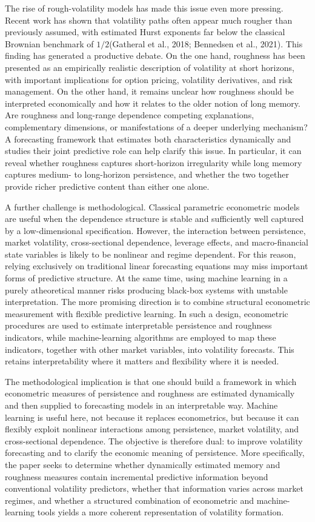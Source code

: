 \documentclass[12pt]{article}
\begin{document}
The rise of rough-volatility models has made this issue even more pressing. Recent work has shown that volatility paths often appear much rougher than previously assumed, with estimated Hurst exponents far below the classical Brownian benchmark of $1/2$(Gatheral et al., 2018; Bennedsen et al., 2021). This finding has generated a productive debate. On the one hand, roughness has been presented as an empirically realistic description of volatility at short horizons, with important implications for option pricing, volatility derivatives, and risk management. On the other hand, it remains unclear how roughness should be interpreted economically and how it relates to the older notion of long memory. Are roughness and long-range dependence competing explanations, complementary dimensions, or manifestations of a deeper underlying mechanism? A forecasting framework that estimates both characteristics dynamically and studies their joint predictive role can help clarify this issue. In particular, it can reveal whether roughness captures short-horizon irregularity while long memory captures medium- to long-horizon persistence, and whether the two together provide richer predictive content than either one alone.

A further challenge is methodological. Classical parametric econometric models are useful when the dependence structure is stable and sufficiently well captured by a low-dimensional specification. However, the interaction between persistence, market volatility, cross-sectional dependence, leverage effects, and macro-financial state variables is likely to be nonlinear and regime dependent. For this reason, relying exclusively on traditional linear forecasting equations may miss important forms of predictive structure. At the same time, using machine learning in a purely atheoretical manner risks producing black-box systems with unstable interpretation. The more promising direction is to combine structural econometric measurement with flexible predictive learning. In such a design, econometric procedures are used to estimate interpretable persistence and roughness indicators, while machine-learning algorithms are employed to map these indicators, together with other market variables, into volatility forecasts. This retains interpretability where it matters and flexibility where it is needed.

The methodological implication is that one should build a framework in which econometric measures of persistence and roughness are estimated dynamically and then supplied to forecasting models in an interpretable way. Machine learning is useful here, not because it replaces econometrics, but because it can flexibly exploit nonlinear interactions among persistence, market volatility, and cross-sectional dependence. The objective is therefore dual: to improve volatility forecasting and to clarify the economic meaning of persistence. More specifically, the paper seeks to determine whether dynamically estimated memory and roughness measures contain incremental predictive information beyond conventional volatility predictors, whether that information varies across market regimes, and whether a structured combination of econometric and machine-learning tools yields a more coherent representation of volatility formation.
\end{document}
